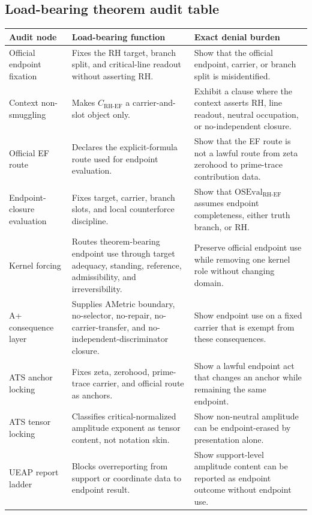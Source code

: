\documentclass[11pt]{article}
\newcommand{\CRHEF}{C_{\mathrm{RH}\text{-}\mathrm{EF}}}
\newcommand{\OSEvalEF}{\mathrm{OSEval}_{\mathrm{RH}\text{-}\mathrm{EF}}}
\begin{document}
\subsection{Load-bearing theorem audit table}

\begingroup\small
\begin{longtable}{L{0.21\textwidth}L{0.31\textwidth}L{0.37\textwidth}}
\toprule
\textbf{Audit node} & \textbf{Load-bearing function} & \textbf{Exact denial burden}\\
\midrule
Official endpoint fixation & Fixes the RH target, branch split, and critical-line readout without asserting RH. & Show that the official endpoint, carrier, or branch split is misidentified.\\
Context non-smuggling & Makes \(\CRHEF\) a carrier-and-slot object only. & Exhibit a clause where the context asserts RH, line readout, neutral occupation, or no-independent closure.\\
Official EF route & Declares the explicit-formula route used for endpoint evaluation. & Show that the EF route is not a lawful route from zeta zerohood to prime-trace contribution data.\\
Endpoint-closure evaluation & Fixes target, carrier, branch slots, and local counterforce discipline. & Show that \(\OSEvalEF\) assumes endpoint completeness, either truth branch, or RH.\\
Kernel forcing & Routes theorem-bearing endpoint use through target adequacy, standing, reference, admissibility, and irreversibility. & Preserve official endpoint use while removing one kernel role without changing domain.\\
A+ consequence layer & Supplies AMetric boundary, no-selector, no-repair, no-carrier-transfer, and no-independent-discriminator closure. & Show endpoint use on a fixed carrier that is exempt from these consequences.\\
ATS anchor locking & Fixes zeta, zerohood, prime-trace carrier, and official route as anchors. & Show a lawful endpoint act that changes an anchor while remaining the same endpoint.\\
ATS tensor locking & Classifies critical-normalized amplitude exponent as tensor content, not notation skin. & Show non-neutral amplitude can be endpoint-erased by presentation alone.\\
UEAP report ladder & Blocks overreporting from support or coordinate data to endpoint result. & Show support-level amplitude content can be reported as endpoint outcome without endpoint use.\\

\end{longtable}
\end{document}
